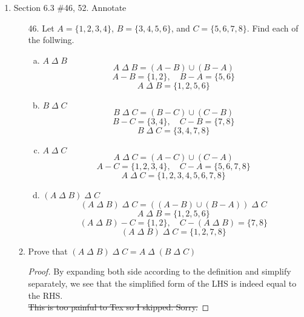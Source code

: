 \documentclass[12pt]{article}
\begin{document}
\begin{enumerate}
\begin{enumerate}
            \end{enumerate}
    \newpage
    \item Section 6.3 \#46, 52. Annotate
        \begin{enumerate}
            \item[46.] Let $A = \{1,2,3,4\}$, $B = \{3,4,5,6\}$, and $C = \{5,6,7,8\}$. Find each of the follwing.
                \begin{enumerate}[a.]
                    \item \( A \; \Delta \; B \)
                    \[
                    A \; \Delta \; B = (A - B) \cup (B - A)
                    \]
                    \[
                    A - B = \{1, 2\}, \quad B - A = \{5, 6\}
                    \]
                    \[
                    A \; \Delta \; B = \{1, 2, 5, 6\}
                    \]
                
                    \item \( B \; \Delta \; C \)
                    \[
                    B \; \Delta \; C = (B - C) \cup (C - B)
                    \]
                    \[
                    B - C = \{3, 4\}, \quad C - B = \{7, 8\}
                    \]
                    \[
                    B \; \Delta \; C = \{3, 4, 7, 8\}
                    \]
                
                    \item \( A \; \Delta \; C \)
                    \[
                    A \; \Delta \; C = (A - C) \cup (C - A)
                    \]
                    \[
                    A - C = \{1, 2, 3, 4\}, \quad C - A = \{5, 6, 7, 8\}
                    \]
                    \[
                    A \; \Delta \; C = \{1, 2, 3, 4, 5, 6, 7, 8\}
                    \]
                
                    \item \( (A \; \Delta \; B) \; \Delta \; C \)
                    \[
                    (A \; \Delta \; B) \; \Delta \; C = ((A - B) \cup (B - A)) \; \Delta \; C
                    \]
                    \[
                    A \; \Delta \; B = \{1, 2, 5, 6\}
                    \]
                    \[
                    (A \; \Delta \; B) - C = \{1, 2\}, \quad C - (A \; \Delta \; B) = \{7, 8\}
                    \]
                    \[
                    (A \; \Delta \; B) \; \Delta \; C = \{1, 2, 7, 8\}
                    \]
                \end{enumerate}

            \item  Prove that $( A \; \Delta \; B) \; \Delta \; C =  A \; \Delta \; (B \; \Delta \; C)$
            \begin{proof}
            By expanding both side according to the definition and simplify separately, we see that the simplified form of the LHS is indeed equal to the RHS.\\
            \sout{This is too painful to Tex so I skipped. Sorry.}
            \end{proof}


\end{enumerate}
\end{enumerate}
\end{document}
